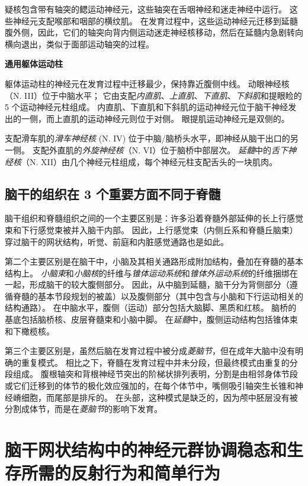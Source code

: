 疑核包含带有轴突的鳃运动神经元，这些轴突在舌咽神经和迷走神经中运行。
这些神经元支配喉部和咽部的横纹肌。
在发育过程中，这些运动神经元迁移到延髓腹外侧，因此，它们的轴突向背内侧运动迷走神经核移动，然后在延髓内急剧转向横向退出，类似于面部运动轴突的过程。


\textbf{通用躯体运动柱}

躯体运动柱的神经元在发育过程中迁移最少，保持靠近腹侧中线。
动眼神经核（N. III）位于中脑水平；
它由支配\textit{内直肌}、\textit{上直肌}、\textit{下直肌}、\textit{下斜肌}和提眼睑的 5 个运动神经元柱组成。
内直肌、下直肌和下斜肌的运动神经元位于脑干神经发出的一侧，而上直肌的运动神经元则位于对侧。
眼提肌运动神经元是双侧的。


支配滑车肌的\textit{滑车神经核} (N. IV) 位于中脑/脑桥头水平，即神经从脑干出口的另一侧。
支配外直肌的\textit{外旋神经核}（N. VI）位于脑桥中部层次。
\textit{延髓}中的\textit{舌下神经核}（N. XII）由几个神经元柱组成，每个神经元柱支配舌头的一块肌肉。



\subsection{脑干的组织在 3 个重要方面不同于脊髓}

脑干组织和脊髓组织之间的一个主要区别是：许多沿着脊髓外部延伸的长上行感觉束和下行感觉束被并入脑干内部。
因此，上行感觉束（内侧丘系和脊髓丘脑束）穿过脑干的网状结构，听觉、前庭和内脏感觉通路也是如此。


第二个主要区别是在脑干中，小脑及其相关通路形成附加结构，叠加在脊髓的基本结构上。
\textit{小脑束}和\textit{小脑核}的纤维与\textit{锥体运动系统}和\textit{锥体外运动系统}的纤维捆绑在一起，形成脑干的较大腹侧部分。
因此，从中脑到延髓，脑干分为背侧部分（遵循脊髓的基本节段规划的被盖）以及腹侧部分（其中包含与小脑和下行运动相关的结构通路）。
在中脑水平，腹侧（运动）部分包括大脑脚、黑质和红核。
脑桥的基底包括脑桥核、皮层脊髓束和小脑中脚。
在\textit{延髓}中，腹侧运动结构包括锥体束和下橄榄核。


第三个主要区别是，虽然后脑在发育过程中被分成\textit{菱脑节}，但在成年大脑中没有明确的重复模式。
相比之下，脊髓在发育过程中并未分段，但最终模式由重复的分段组成。
腹根轴突和背根神经节突出的阶梯状排列表明，分割是由相邻身体节段或它们迁移到的体节的极化效应强加的，在每个体节中，嘴侧吸引轴突生长锥和神经嵴细胞，而尾部是排斥的。
在头部，这种模式是缺乏的，因为颅中胚层没有被分割成体节，而是在\textit{菱脑节}的影响下发育。



\section{脑干网状结构中的神经元群协调稳态和生存所需的反射行为和简单行为}

